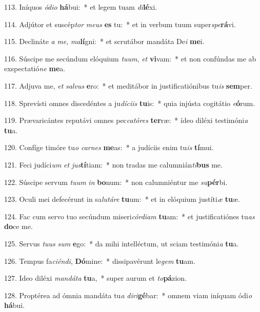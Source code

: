 113. Iníquos \textit{ó}\textit{di}\textit{o} \textbf{há}bui:~*  et legem tuam \textit{di}\textbf{lé}xi.\

114. Adjútor et suscép\textit{tor} \textit{me}\textit{us} \textbf{es} tu:~*  et in verbum tuum super\textit{spe}\textbf{rá}vi.\

115. Declináte \textit{a} \textit{me}, \textit{ma}\textbf{lí}gni:~*  et scrutábor mandáta De\textit{i} \textbf{me}i.\

116. Súscipe me secúndum elóquium \textit{tu}\textit{um}, \textit{et} \textbf{vi}vam:~*  et non confúndas me ab exspectatió\textit{ne} \textbf{me}a.\

117. Adjuva me, \textit{et} \textit{sal}\textit{vus} \textbf{e}ro:~*  et meditábor in justificatiónibus tu\textit{is} \textbf{sem}per.\

118. Sprevísti omnes discedéntes a ju\textit{dí}\textit{ci}\textit{is} \textbf{tu}is:~*  quia injústa cogitátio \textit{e}\textbf{ó}rum.\

119. Prævaricántes reputávi omnes pec\textit{ca}\textit{tó}\textit{res} \textbf{ter}ræ:~*  ídeo diléxi testimóni\textit{a} \textbf{tu}a.\

120. Confíge timóre tu\textit{o} \textit{car}\textit{nes} \textbf{me}as:~*  a judíciis enim tu\textit{is} \textbf{tí}mui.\

121. Feci judíci\textit{um} \textit{et} \textit{jus}\textbf{tí}tiam:~*  non tradas me calumnián\textit{ti}\textbf{bus} me.\

122. Súscipe servum \textit{tu}\textit{um} \textit{in} \textbf{bo}num:~*  non calumniéntur me \textit{su}\textbf{pér}bi.\

123. Oculi mei defecérunt in sa\textit{lu}\textit{tá}\textit{re} \textbf{tu}um:~*  et in elóquium justíti\textit{æ} \textbf{tu}æ.\

124. Fac cum servo tuo secúndum miseri\textit{cór}\textit{di}\textit{am} \textbf{tu}am:~*  et justificatiónes tu\textit{as} \textbf{do}ce me.\

125. Servus \textit{tu}\textit{us} \textit{sum} \textbf{e}go:~*  da mihi intelléctum, ut sciam testimóni\textit{a} \textbf{tu}a.\

126. Tempus fa\textit{ci}\textit{én}\textit{di}, \textbf{Dó}mine:~*  dissipavérunt le\textit{gem} \textbf{tu}am.\

127. Ideo diléxi \textit{man}\textit{dá}\textit{ta} \textbf{tu}a,~*  super aurum et \textit{to}\textbf{pá}zion.\

128. Proptérea ad ómnia mandáta tu\textit{a} \textit{di}\textit{ri}\textbf{gé}bar:~*  omnem viam iníquam ódi\textit{o} \textbf{há}bui.\

